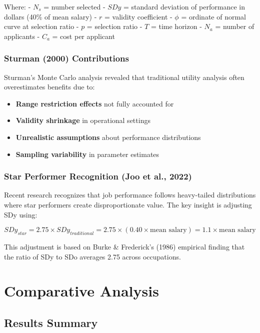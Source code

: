 \documentclass[
]{article}
\providecommand{\tightlist}{%
  \setlength{\itemsep}{0pt}\setlength{\parskip}{0pt}}
\begin{document}
Where: - \(N_s\) = number selected - \(SDy\) = standard deviation of
performance in dollars (40\% of mean salary) - \(r\) = validity
coefficient - \(\phi\) = ordinate of normal curve at selection ratio -
\(p\) = selection ratio - \(T\) = time horizon - \(N_a\) = number of
applicants - \(C_a\) = cost per applicant

\subsubsection{Sturman (2000)
Contributions}\label{sturman-2000-contributions}

Sturman's Monte Carlo analysis revealed that traditional utility
analysis often overestimates benefits due to:

\begin{itemize}
\tightlist
\item
  \textbf{Range restriction effects} not fully accounted for
\item
  \textbf{Validity shrinkage} in operational settings
\item
  \textbf{Unrealistic assumptions} about performance distributions
\item
  \textbf{Sampling variability} in parameter estimates
\end{itemize}

\subsubsection{Star Performer Recognition (Joo et al.,
2022)}\label{star-performer-recognition-joo-et-al.-2022}

Recent research recognizes that job performance follows heavy-tailed
distributions where star performers create disproportionate value. The
key insight is adjusting SDy using:

\[SDy_{star} = 2.75 \times SDy_{traditional} = 2.75 \times (0.40 \times \text{mean salary}) = 1.1 \times \text{mean salary}\]

This adjustment is based on Burke \& Frederick's (1986) empirical
finding that the ratio of SDy to SDo averages 2.75 across occupations.

\section{Comparative Analysis}\label{comparative-analysis}

\subsection{Results Summary}\label{results-summary}
\end{document}
